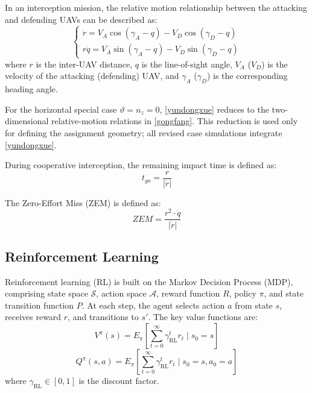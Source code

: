 \documentclass[lettersize,journal]{IEEEtran}
\begin{document}
In an interception mission, the relative motion relationship between the attacking and
defending UAVs can be described as:
\begin{equation}
\label{gongfang}
\left\{\begin{matrix}\dot{r} =V_{A}\cos(\gamma_{A}-q)-V_{D}\cos(\gamma_{D}-q) \\
r\dot{q} =V_{A}\sin(\gamma_{A}-q)-V_{D}\sin(\gamma_{D}-q)\end{matrix}\right.
\end{equation}
where $r$ is the inter-UAV distance, $q$ is the line-of-sight angle, $V_{A}$ ($V_{D}$) is the
velocity of the attacking (defending) UAV, and $\gamma_{A}$ ($\gamma_{D}$) is the
corresponding heading angle.

For the horizontal special case $\vartheta=n_z=0$, \eqref{yundongxue} reduces to the
two-dimensional relative-motion relations in \eqref{gongfang}. This reduction is used only
for defining the assignment geometry; all revised case simulations integrate
\eqref{yundongxue}.

During cooperative interception, the remaining impact time is defined as:
\begin{equation}
\label{shijian}
t_{go}=\frac{r}{\left|\dot{r}\right|}
\end{equation}

The Zero-Effort Miss (ZEM) is defined as:
\begin{equation}
\label{ZEM}
ZEM = \frac{r^{2}\cdot\dot{q}}{\left|\dot{r}\right|}
\end{equation}

\subsection{Reinforcement Learning}

Reinforcement learning (RL) is built on the Markov Decision Process (MDP), comprising state
space $\mathcal{S}$, action space $\mathcal{A}$, reward function $R$, policy $\pi$, and state
transition function $P$.
At each step, the agent selects action $a$ from state $s$, receives reward $r$, and
transitions to $s'$.
The key value functions are:
\begin{equation}
\label{RLV}
V^{\pi}(s)=E_{\pi}\left[\sum_{t=0}^{\infty}\gamma_{\mathrm{RL}}^{t}r_{t}\mid s_{0}=s\right]
\end{equation}
\begin{equation}
\label{RLQ}
Q^{\pi}(s,a)=E_{\pi}\left[\sum_{t=0}^{\infty}\gamma_{\mathrm{RL}}^{t}r_{t}\mid s_{0}=s,a_{0}=a\right]
\end{equation}
where $\gamma_{\mathrm{RL}}\in[0,1]$ is the discount factor.
\end{document}
